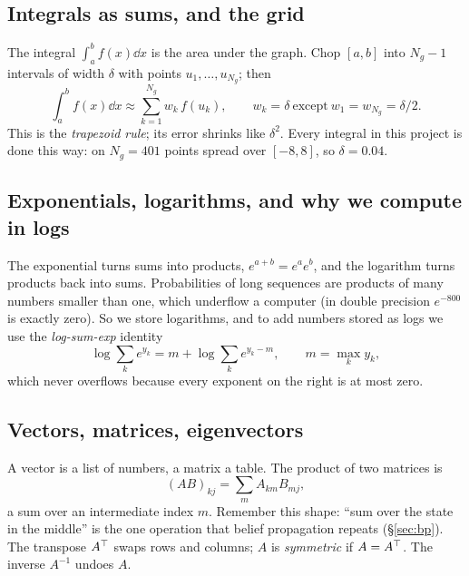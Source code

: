 \subsection{Integrals as sums, and the grid}

The integral $\int_a^b f(x)\dd x$ is the area under the graph. Chop $[a,b]$ into $N_g-1$ intervals of width
$\delta$ with points $u_1,\dots,u_{N_g}$; then
\begin{equation}\label{eq:trapezoid}
  \int_a^b f(x)\dd x\approx\sum_{k=1}^{N_g}w_k\,f(u_k),\qquad w_k=\delta\ \text{except}\ w_1=w_{N_g}=\delta/2 .
\end{equation}
This is the \emph{trapezoid rule}; its error shrinks like $\delta^2$. Every integral in this project is done
this way: on $N_g=401$ points spread over $[-8,8]$, so $\delta=0.04$.

\subsection{Exponentials, logarithms, and why we compute in logs}

The exponential turns sums into products, $e^{a+b}=e^ae^b$, and the logarithm turns products back into sums.
Probabilities of long sequences are products of many numbers smaller than one, which underflow a computer
(in double precision $e^{-800}$ is exactly zero). So we store logarithms, and to add numbers stored as logs
we use the \emph{log-sum-exp} identity
\[
  \log\sum_k e^{y_k}=m+\log\sum_k e^{y_k-m},\qquad m=\max_k y_k,
\]
which never overflows because every exponent on the right is at most zero.

\subsection{Vectors, matrices, eigenvectors}

A vector is a list of numbers, a matrix a table. The product of two matrices is
\begin{equation}\label{eq:matprod}
  (AB)_{kj}=\sum_m A_{km}B_{mj},
\end{equation}
a sum over an intermediate index $m$. Remember this shape: ``sum over the state in the middle'' is the one
operation that belief propagation repeats (\S\ref{sec:bp}). The transpose $A^{\top}$ swaps rows and columns; $A$ is
\emph{symmetric} if $A=A^{\top}$. The inverse $A^{-1}$ undoes $A$.

